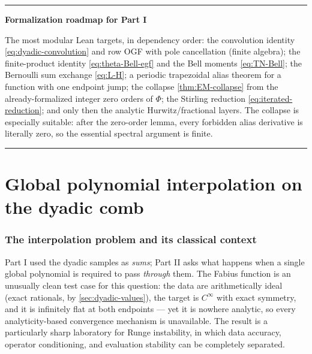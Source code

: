 \documentclass[11pt,oneside]{article}
\numberwithin{equation}{section}
\theoremstyle{definition}
\theoremstyle{remark}
\newenvironment{statusbox}[1]{%
  \par\smallskip\noindent\begin{center}\begin{minipage}{0.94\textwidth}%
  \hrule\vspace{0.5em}\noindent\textbf{#1}\par\smallskip
}{%
  \vspace{0.5em}\hrule\end{minipage}\end{center}\smallskip
}
\begin{document}
\begin{statusbox}{Formalization roadmap for Part I}
The most modular Lean targets, in dependency order: the convolution
identity \eqref{eq:dyadic-convolution} and row OGF with pole
cancellation (finite algebra); the finite-product identity
\eqref{eq:theta-Bell-egf} and the Bell moments \eqref{eq:TN-Bell};
the Bernoulli sum exchange \eqref{eq:L-H}; a periodic trapezoidal
alias theorem for a function with one endpoint jump; the collapse
\cref{thm:EM-collapse} from the already-formalized integer zero
orders of $\Phi$; the Stirling reduction
\eqref{eq:iterated-reduction}; and only then the analytic
Hurwitz/fractional layers.  The collapse is especially suitable: after
the zero-order lemma, every forbidden alias derivative is literally
zero, so the essential spectral argument is finite.
\end{statusbox}

\part{Global polynomial interpolation on the dyadic comb}
\label{part:interp}

\section{The interpolation problem and its classical context}
\label{sec:interp-context}

Part I used the dyadic samples as \emph{sums}; Part II asks what
happens when a single global polynomial is required to pass
\emph{through} them.  The Fabius function is an unusually clean test
case for this question: the data are arithmetically ideal (exact
rationals, by \cref{sec:dyadic-values}), the target is $C^\infty$ with
exact symmetry, and it is infinitely flat at both endpoints --- yet it
is nowhere analytic, so every analyticity-based convergence mechanism
is unavailable.  The result is a particularly sharp laboratory for
Runge instability, in which data accuracy, operator conditioning, and
evaluation stability can be completely separated.
\end{document}
